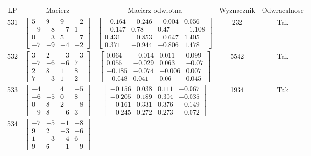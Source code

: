 \documentclass[a4paper,12pt]{article}
\begin{document}
\bgroup {} \vspace{0.2in} \begin{tabular}{c c c c c}
LP & Macierz & Macierz odwrotna & Wyznacznik & Odwracalnosc\\
531
&
$\begin{bmatrix} 5 & 9 & 9 & -2 \\ -9 & -8 & -7 & 1 \\ 0 & -3 & 5 & -7 \\ -7 & -9 & -4 & -2 \end{bmatrix}$
&
$\begin{bmatrix} -0.164 & -0.246 & -0.004 & 0.056 \\ -0.147 & 0.78 & 0.47 & -1.108 \\ 0.431 & -0.853 & -0.647 & 1.405 \\ 0.371 & -0.944 & -0.806 & 1.478 \end{bmatrix}$
&
232
&
Tak
\\
532
&
$\begin{bmatrix} 3 & 2 & -3 & -3 \\ -7 & -6 & -6 & 7 \\ 2 & 8 & 1 & 8 \\ 7 & -3 & 1 & 2 \end{bmatrix}$
&
$\begin{bmatrix} 0.064 & -0.014 & 0.011 & 0.099 \\ 0.055 & -0.029 & 0.063 & -0.07 \\ -0.185 & -0.074 & -0.006 & 0.007 \\ -0.048 & 0.041 & 0.06 & 0.045 \end{bmatrix}$
&
5542
&
Tak
\\
533
&
$\begin{bmatrix} -4 & 1 & 4 & -5 \\ -6 & -5 & 0 & 8 \\ 0 & 8 & 2 & -8 \\ -9 & 8 & -6 & 3 \end{bmatrix}$
&
$\begin{bmatrix} -0.156 & 0.038 & 0.111 & -0.067 \\ -0.205 & 0.189 & 0.304 & -0.035 \\ -0.161 & 0.331 & 0.376 & -0.149 \\ -0.245 & 0.272 & 0.273 & -0.072 \end{bmatrix}$
&
1934
&
Tak
\\
534
&
$\begin{bmatrix} -7 & -5 & -1 & -8 \\ 9 & 2 & -3 & -6 \\ 1 & -3 & -4 & 6 \\ 9 & 6 & -1 & -9 \end{bmatrix}$

\end{tabular}
\end{document}
